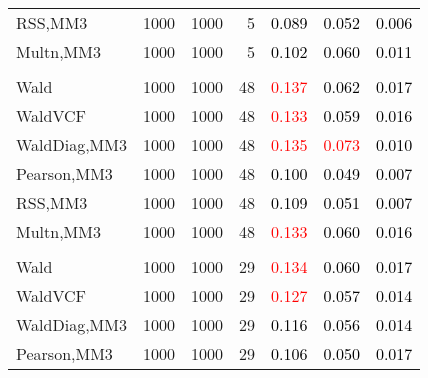 \documentclass[
]{article}
\begin{document}
\begin{table}[H]
{\begin{tabular}[t]{lrrrrrr}
\hspace{1em}RSS,MM3 & 1000 & 1000 & 5 & \textcolor{black}{0.089} & \textcolor{black}{0.052} & \textcolor{black}{0.006}\\
\hspace{1em}Multn,MM3 & 1000 & 1000 & 5 & \textcolor{black}{0.102} & \textcolor{black}{0.060} & \textcolor{black}{0.011}\\
\addlinespace[0.3em]
\multicolumn{7}{l}{\textbf{1F 15V}}\\
\hspace{1em}Wald & 1000 & 1000 & 48 & \textcolor{red}{0.137} & \textcolor{black}{0.062} & \textcolor{black}{0.017}\\
\hspace{1em}WaldVCF & 1000 & 1000 & 48 & \textcolor{red}{0.133} & \textcolor{black}{0.059} & \textcolor{black}{0.016}\\
\hspace{1em}WaldDiag,MM3 & 1000 & 1000 & 48 & \textcolor{red}{0.135} & \textcolor{red}{0.073} & \textcolor{black}{0.010}\\
\hspace{1em}Pearson,MM3 & 1000 & 1000 & 48 & \textcolor{black}{0.100} & \textcolor{black}{0.049} & \textcolor{black}{0.007}\\
\hspace{1em}RSS,MM3 & 1000 & 1000 & 48 & \textcolor{black}{0.109} & \textcolor{black}{0.051} & \textcolor{black}{0.007}\\
\hspace{1em}Multn,MM3 & 1000 & 1000 & 48 & \textcolor{red}{0.133} & \textcolor{black}{0.060} & \textcolor{black}{0.016}\\
\addlinespace[0.3em]
\multicolumn{7}{l}{\textbf{2F 10V}}\\
\hspace{1em}Wald & 1000 & 1000 & 29 & \textcolor{red}{0.134} & \textcolor{black}{0.060} & \textcolor{black}{0.017}\\
\hspace{1em}WaldVCF & 1000 & 1000 & 29 & \textcolor{red}{0.127} & \textcolor{black}{0.057} & \textcolor{black}{0.014}\\
\hspace{1em}WaldDiag,MM3 & 1000 & 1000 & 29 & \textcolor{black}{0.116} & \textcolor{black}{0.056} & \textcolor{black}{0.014}\\
\hspace{1em}Pearson,MM3 & 1000 & 1000 & 29 & \textcolor{black}{0.106} & \textcolor{black}{0.050} & \textcolor{black}{0.017}\\

\end{tabular}}
\end{table}
\end{document}
